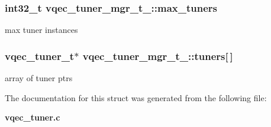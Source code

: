 \subsubsection{\setlength{\rightskip}{0pt plus 5cm}int32\_\-t \bf{vqec\_\-tuner\_\-mgr\_\-t\_\-::max\_\-tuners}}\label{structvqec__tuner__mgr__t___c060f214910b941b9bd3db056c88d3bd}


max tuner instances 
\subsubsection{\setlength{\rightskip}{0pt plus 5cm}\bf{vqec\_\-tuner\_\-t}$\ast$ \bf{vqec\_\-tuner\_\-mgr\_\-t\_\-::tuners}[$\,$]}\label{structvqec__tuner__mgr__t___d9e06fe21f1334fb7cefb3fe10b2308a}


array of tuner ptrs 

The documentation for this struct was generated from the following file:\begin{CompactItemize}
\item 
\bf{vqec\_\-tuner.c}\end{CompactItemize}
